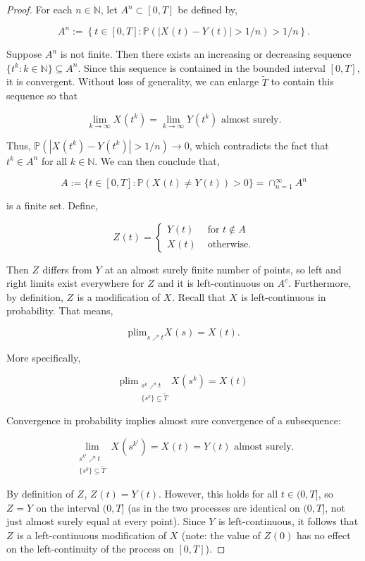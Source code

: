 \documentclass[12pt]{article}
\newcommand{\mb}{\mathbb}
\newcommand{\ra}{\rightarrow}
\newcommand{\te}{\text}
\newcommand{\ind}{\hspace{24pt}}
\newcommand{\pr}{\mb{P}}							%
\newcommand{\T}{T}								%
\renewcommand{\t}{t}							%
\renewcommand{\tt}{s}							%
\newcommand{\pup}[1]{^{#1}}							%
\renewcommand{\it}{k}								%
\newcommand{\itt}{i}								%
\newcommand{\numb}{n}								%
\newcommand{\rxvt}[2]{X_{#1}{(#2)}}					%
\newcommand{\rxvtt}[2]{Y_{#1}{(#2)}}				%
\newcommand{\rxvttt}[2]{Z_{#1}{(#2)}}				%
\newcommand{\rxvts}[2]{X_{#1}{#2}}					%
\newcommand{\rxvtts}[2]{Y_{#1}{#2}}					%
\newcommand{\rxvttts}[2]{Z_{#1}{#2}}				%
\newcommand{\alt}{\widetilde}						%
\newcommand{\typset}{A}							%
\begin{document}
\begin{proof}
\ind For each \(\numb \in \mb{N}\), let \(\typset\pup{\numb} \subset [0,\T]\) be defined by,

\[\typset\pup{\numb} := \left\{\t\in [0,\T]: \pr\left(|\rxvt{}{\t} - \rxvtt{}{\t}| > 1/\numb\right) > 1/\numb\right\}.\] 

Suppose \(\typset\pup{\numb}\) is not finite. Then there exists an increasing or decreasing sequence \(\{\t\pup{\it}:\it\in \mb{N}\}\subseteq \typset\pup{\numb}\). Since this sequence is contained in the bounded interval \([0,\T]\), it is convergent. Without loss of generality, we can enlarge \(\alt{T}\) to contain this sequence so that

\[\lim_{\it \ra\infty} \rxvt{}{\t\pup{\it}} = \lim_{\it\ra\infty} \rxvtt{}{\t\pup{\it}} \te{ almost surely.}\]

Thus, \(\pr(|\rxvt{}{\t\pup{\it}} - \rxvtt{}{\t\pup{\it}}| > 1/\numb) \ra 0\), which contradicts the fact that \(\t\pup{\it} \in \typset\pup{\numb}\) for all \(\it\in\mb{N}\). We can then conclude that,

\[\typset:= \{\t\in [0,\T]: \pr(\rxvt{}{\t} \neq \rxvtt{}{\t}) > 0\} = \cap_{\numb = 1}^\infty \typset\pup{\numb}\]

is a finite set. Define,

\[\rxvttt{}{\t}= \begin{cases}
\rxvtt{}{\t} &\te{ for } \t \notin \typset\\
\rxvt{}{\t} &\te{ otherwise.}
\end{cases}\]

Then \(\rxvttts{}{}\) differs from \(\rxvtts{}{}\) at an almost surely finite number of points, so left and right limits exist everywhere for \(\rxvttts{}{}\) and it is left-continuous on \(\typset^c\). Furthermore, by definition, \(\rxvttts{}{}\) is a modification of \(\rxvts{}{}\). Recall that \(\rxvts{}{}\) is left-continuous in probability. That means,

\[\te{plim}_{\tt\nearrow \t} \rxvt{}{\tt} = \rxvt{}{\t}.\]

More specifically,

\[\te{plim}_{\substack{\tt\pup{\it}\nearrow \t\\\{\tt\pup{\it}\} \subseteq \alt{T}}} \rxvt{}{\tt\pup{\it}} = \rxvt{}{\t}\]

Convergence in probability implies almost sure convergence of a subsequence:

\[\lim_{\substack{\tt\pup{\it\pup{\itt}} \nearrow \t\\\{\tt\pup{\it}\}\subseteq \alt{T}}} \rxvt{}{\tt\pup{\it\pup{\itt}}} = \rxvt{}{\t} = \rxvtt{}{\t} \te{ almost surely.}\]

By definition of \(\rxvttts{}{}\), \(\rxvttt{}{\t} = \rxvtt{}{\t}\). However, this holds for all \(\t \in (0,\T]\), so \(\rxvttts{}{} = \rxvtts{}{}\) on the interval \((0,\T]\) (as in the two processes are identical on \((0,\T]\), not just almost surely equal at every point). Since \(\rxvtts{}{}\) is left-continuous, it follows that \(\rxvttts{}{}\) is a left-continuous modification of \(\rxvts{}{}\) (note: the value of \(\rxvttt{}{0}\) has no effect on the left-continuity of the process on \([0,\T]\)).
\end{proof}
\end{document}
